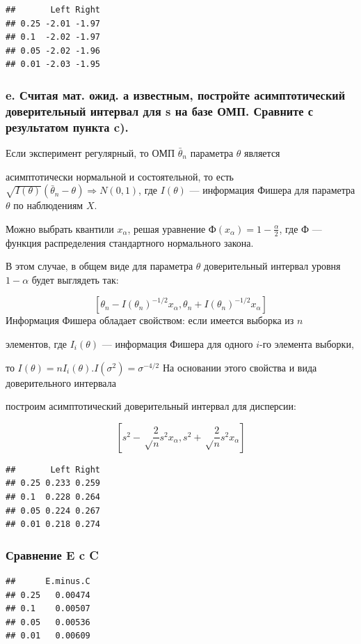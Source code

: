 \documentclass[]{article}
\begin{document}
\begin{verbatim}
##       Left Right
## 0.25 -2.01 -1.97
## 0.1  -2.02 -1.97
## 0.05 -2.02 -1.96
## 0.01 -2.03 -1.95
\end{verbatim}

\subsubsection{e. Считая мат. ожид. а известным, постройте
асимптотический доверительный интервал для s на базе ОМП. Сравните с
результатом пункта c).}\label{e.--.-.--------s---.-----c.}

Если эксперимент регулярный, то ОМП \(\bar θ_n\) параметра \(θ\)
является

асимптотически нормальной и состоятельной, то есть
\(\sqrt{I(θ)}(\bar θ_n − θ)⇒ N(0,1)\), где \(I(θ)\) --- информация
Фишера для параметра \(θ\) по наблюдениям \(X\).

Можно выбрать квантили \(x_α\), решая уравнение
\(Ф(x_α) = 1- \frac {α}{2}\), где \(Ф\) --- функция распределения
стандартного нормального закона.

В этом случае, в общем виде для параметра \(θ\) доверительный интервал
уровня \(1-α\) будет выглядеть так:

\[[ θ_n − I( θ_n)^{−1 /2} x_{\alpha} , θ_n + I( θ_n)^{−1 /2} x_{\alpha}]\]
Информация Фишера обладает свойством: если имеется выборка из \(n\)

элементов, где \(I_i(θ)\) --- информация Фишера для одного \(i\)-го
элемента выборки,

то \(I(θ)=nI_i(θ)\).\(I(σ^2) = σ^{−4/2}\) На основании этого свойства и
вида доверительного интервала

построим асимптотический доверительный интервал для дисперсии:

\[[s^2−\sqrt \frac {2}{n} s^2 x_α, s^2+\sqrt \frac {2}{n} s^2 x_α]\]

\begin{verbatim}
##       Left Right
## 0.25 0.233 0.259
## 0.1  0.228 0.264
## 0.05 0.224 0.267
## 0.01 0.218 0.274
\end{verbatim}

\subsubsection{Сравнение E c C}\label{-e-c-c}

\begin{verbatim}
##      E.minus.C
## 0.25   0.00474
## 0.1    0.00507
## 0.05   0.00536
## 0.01   0.00609
\end{verbatim}
\end{document}
